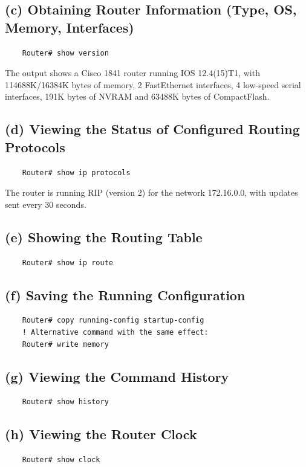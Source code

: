 \documentclass[12pt,a4paper]{article}
\begin{document}
\subsection*{(c) Obtaining Router Information (Type, OS, Memory, Interfaces)}
\begin{lstlisting}
	Router# show version
\end{lstlisting}
The output shows a Cisco 1841 router running IOS 12.4(15)T1, with 114688K/16384K bytes of memory, 2 FastEthernet interfaces, 4 low-speed serial interfaces, 191K bytes of NVRAM and 63488K bytes of CompactFlash.

\subsection*{(d) Viewing the Status of Configured Routing Protocols}
\begin{lstlisting}
	Router# show ip protocols
\end{lstlisting}
The router is running RIP (version 2) for the network 172.16.0.0, with updates sent every 30 seconds.

\subsection*{(e) Showing the Routing Table}
\begin{lstlisting}
	Router# show ip route
\end{lstlisting}

\subsection*{(f) Saving the Running Configuration}
\begin{lstlisting}
	Router# copy running-config startup-config
	! Alternative command with the same effect:
	Router# write memory
\end{lstlisting}

\subsection*{(g) Viewing the Command History}
\begin{lstlisting}
	Router# show history
\end{lstlisting}

\subsection*{(h) Viewing the Router Clock}
\begin{lstlisting}
	Router# show clock
\end{lstlisting}
\end{document}
